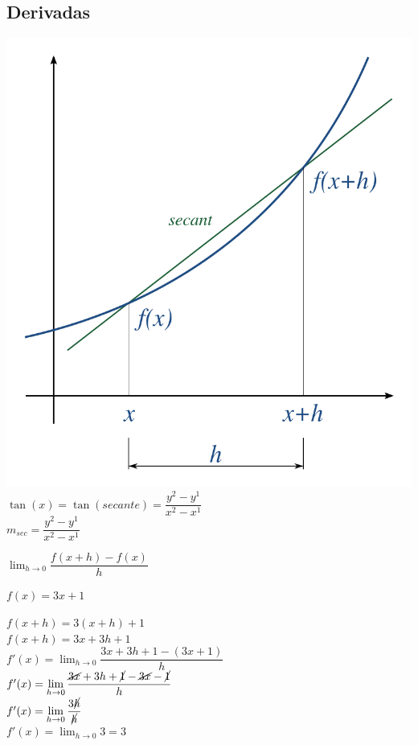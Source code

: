 \documentclass[stu, 12pt, a4paper, donotrepeattitle, floatsintext, natbib]{apa7}
\begin{document}
    \subsection{Derivadas}\label{subsec:derivadas}
    \begin{paracol}{2}
        \includegraphics[scale=0.2]{derivative}
        \switchcolumn
        $\tan(x) = \tan({secante}) = \dfrac{y^2-y^1}{x^2-x^1}$\\[0.5cm]
        $m_{sec} = \dfrac{y^2-y^1}{x^2-x^1}$
    \end{paracol}

    $\displaystyle\lim_{h \to 0} \dfrac{f(x+h)-f(x)}{h} $\\[0.5cm]
    \begin{center}
        $f(x)=3x+1$\\[0.5cm]
    \end{center}
    \begin{paracol}{2}
        $f(x+h)=3(x+h)+1$\\[0.5cm]
        $f(x+h)=3x+3h+1$\\[0.5cm]
        \switchcolumn
        $f'(x)=\displaystyle\lim_{h\to0} \dfrac{3x+3h+1-(3x+1)}{h}$\\[0.5cm]
        $f'(x)=\displaystyle\lim_{h\to0} \dfrac{\cancel{3x}+3h+\cancel{1}-\cancel{3x}-\cancel{1}}{h}$\\[0.5cm]
        $f'(x)=\displaystyle\lim_{h\to0} \dfrac{3\cancel{h}}{\cancel{h}}$\\[0.5cm]
        $f'(x)=\displaystyle\lim_{h\to0} 3 = 3$\\[0.5cm]
    \end{paracol}
\end{document}
